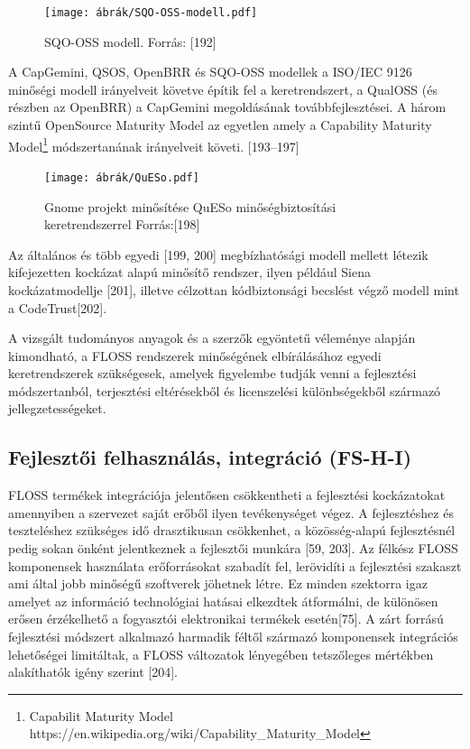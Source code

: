 \documentclass[12pt,magyar,a4paper,oneside]{scrreprt}
\begin{document}
\begin{figure}
\centering
\texttt{[image: ábrák/SQO-OSS-modell.pdf]}
\caption{SQO-OSS modell. Forrás: {[}192{]}}
\end{figure}

A CapGemini, QSOS, OpenBRR és SQO-OSS modellek a ISO/IEC 9126 minőségi
modell irányelveit követve építik fel a keretrendszert, a QualOSS (és
részben az OpenBRR) a CapGemini megoldásának továbbfejlesztései. A három
szintű OpenSource Maturity Model az egyetlen amely a Capability Maturity
Model\footnote{Capabilit Maturity Model
  https://en.wikipedia.org/wiki/Capability\_Maturity\_Model}
módszertanának irányelveit követi. {[}193--197{]}

\begin{figure}
\hypertarget{fig:QuESo}{%
\centering
\texttt{[image: ábrák/QuESo.pdf]}
\caption{Gnome projekt minősítése QuESo minőségbiztosítási
keretrendszerrel Forrás:{[}198{]}}\label{fig:QuESo}
}
\end{figure}

Az általános és több egyedi {[}199, 200{]} megbízhatósági modell mellett
létezik kifejezetten kockázat alapú minősítő rendszer, ilyen például
Siena kockázatmodellje {[}201{]}, illetve célzottan kódbiztonsági
becslést végző modell mint a CodeTrust{[}202{]}.

A vizsgált tudományos anyagok és a szerzők egyöntetű véleménye alapján
kimondható, a FLOSS rendszerek minőségének elbírálásához egyedi
keretrendszerek szükségesek, amelyek figyelembe tudják venni a
fejlesztési módszertanból, terjesztési eltérésekből és licenszelési
különbségekből származó jellegzetességeket.

\hypertarget{sec:FS-H-I}{%
\subsection{Fejlesztői felhasználás, integráció
(FS-H-I)}\label{sec:FS-H-I}}

FLOSS termékek integrációja jelentősen csökkentheti a fejlesztési
kockázatokat amennyiben a szervezet saját erőből ilyen tevékenységet
végez. A fejlesztéshez és teszteléshez szükséges idő drasztikusan
csökkenhet, a közösség-alapú fejlesztésnél pedig sokan önként
jelentkeznek a fejlesztői munkára {[}59, 203{]}. Az félkész FLOSS
komponensek használata erőforrásokat szabadít fel, lerövidíti a
fejlesztési szakaszt ami által jobb minőségű szoftverek jöhetnek létre.
Ez minden szektorra igaz amelyet az információ technológiai hatásai
elkezdtek átformálni, de különösen erősen érzékelhető a fogyasztói
elektronikai termékek esetén{[}75{]}. A zárt forrású fejlesztési
módszert alkalmazó harmadik féltől származó komponensek integrációs
lehetőségei limitáltak, a FLOSS változatok lényegében tetszőleges
mértékben alakíthatók igény szerint {[}204{]}.
\end{document}
